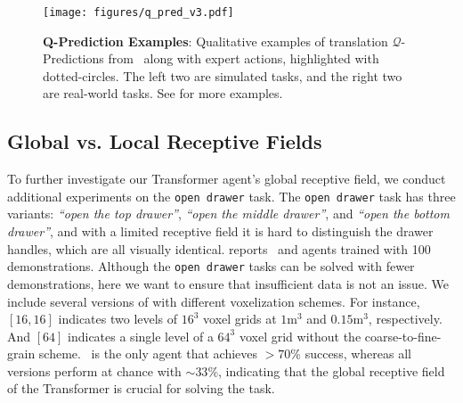 \begin{figure*}[!t]
    \centering
    \vspace{-1.2cm}
    \hspace*{-1.5cm}
    \texttt{[image: figures/q\_pred\_v3.pdf]}
    \caption{\textbf{Q-Prediction Examples}: Qualitative examples of translation $\mathcal{Q}$-Predictions from \model~along with expert actions, highlighted with dotted-circles. The left two are simulated tasks, and the right two are real-world tasks. See  for more examples.}
    \label{fig:q_pred} 
    \vspace{-1em}
\end{figure*}

\subsection{Global vs. Local Receptive Fields}
To further investigate our Transformer agent's global receptive field, we conduct additional experiments on the \texttt{open drawer} task. 
The \texttt{open drawer} task has three variants: \textit{``open the top drawer''}, \textit{``open the middle drawer''}, and \textit{``open the bottom drawer''}, and with a limited receptive field it is hard to distinguish the drawer handles, which are all visually identical. 
 reports \model~and \unet agents trained with 100 demonstrations. Although the \texttt{open drawer} tasks can be solved with fewer demonstrations, here we want to ensure that insufficient data is not an issue. We include several versions of \unet with different voxelization schemes. For instance, $[16,16]$ indicates two levels of $16^3$ voxel grids at $1\textrm{m}^3$ and $0.15\textrm{m}^3$, respectively. And $[64]$ indicates a single level of a $64^3$ voxel grid without the coarse-to-fine-grain scheme. \model~is the only agent that achieves $>70\%$ success, whereas all \unet versions perform at chance with $\sim 33\%$, indicating that the global receptive field of the Transformer is crucial for solving the task. 

